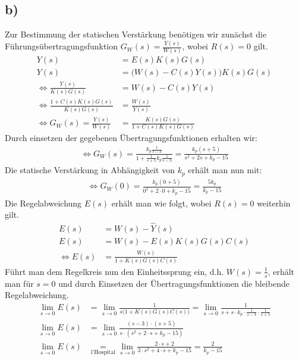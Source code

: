 \documentclass[11pt]{scrartcl} %
\begin{document}
\subsection*{b)}
Zur Bestimmung der statischen Verstärkung benötigen wir zunächst die Führungsübertragungsfunktion $G_W(s)=\frac{Y(s)}{W(s)}$, wobei $R(s)=0$ gilt.
\begin{align*}
	Y(s)&=E(s)K(s)G(s)\\
	Y(s)&=\bigl(W(s)-C(s)Y(s)\bigr)K(s)G(s)\\
	\Leftrightarrow\frac{Y(s)}{K(s)G(s)}&=W(s)-C(s)Y(s)\\
	\Leftrightarrow\frac{1+C(s)K(s)G(s)}{K(s)G(s)}&=\frac{W(s)}{Y(s)}\\
	\Leftrightarrow G_W(s)=\frac{Y(s)}{W(s)}&=\frac{K(s)G(s)}{1+C(s)K(s)G(s)}
\end{align*}
Durch einsetzen der gegebenen Übertragungsfunktionen erhalten wir:
\begin{align*}
	\Leftrightarrow G_W(s)=\frac{k_p\frac{1}{s-3}}{1+\frac{1}{s+5}k_p\frac{1}{s-3}}=\frac{k_p(s+5)}{s^2+2s+k_p-15}
\end{align*}
Die statische Verstärkung in Abhängigkeit von $k_p$ erhält man nun mit:
\begin{align*}
	\Leftrightarrow G_W(0)=\frac{k_p(0+5)}{0^2+2\cdot0+k_p-15}=\frac{5k_p}{k_p-15}
\end{align*}
Die Regelabweichung $E(s)$ erhält man wie folgt, wobei $R(s)=0$ weiterhin gilt.
\begin{align*}
	E(s)&=W(s)-\hat{Y}(s)\\
	E(s)&=W(s)-E(s)K(s)G(s)C(s)\\
	\Leftrightarrow E(s)&=\frac{W(s)}{1+K(s)G(s)C(s)}
\end{align*}
Führt man dem Regelkreis nun den Einheitssprung ein, d.h. $W(s)=\frac{1}{s}$, erhält man für $s=0$ und durch Einsetzen der Übertragungsfunktionen die bleibende Regelabweichung.
\begin{align*}
	\lim \limits_{s \to 0}E(s)&=\lim \limits_{s \to 0}\frac{1}{s\bigl(1+K(s)G(s)C(s)\bigr)}=\lim \limits_{s \to 0}\frac{1}{s+s\cdot k_p\cdot\frac{1}{s-3}\cdot\frac{1}{s+5}}\\
	\lim \limits_{s \to 0}E(s)&=\lim \limits_{s \to 0}\frac{(s-3)\cdot(s+5)}{s\cdot(s^2+2\cdot s+k_p-15)}\\
	\lim \limits_{s \to 0}E(s)&\underset{\text{l'Hospital}}{=}\lim \limits_{s \to 0}\frac{2\cdot s+2}{3\cdot s^2+4\cdot s+k_p-15}=\frac{2}{k_p-15}
\end{align*}
\end{document}
